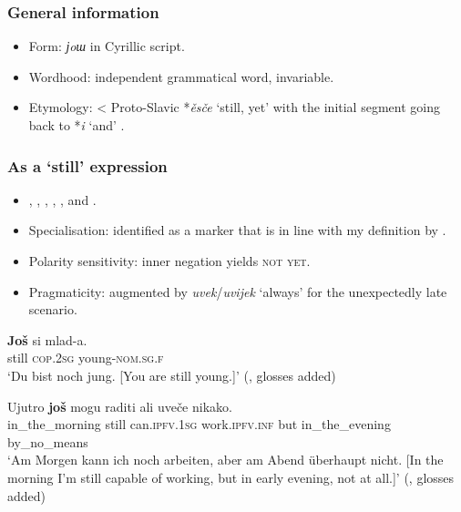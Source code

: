 \subsubsection{General information}
\begin{itemize}
	\item Form: \textit{јoш} in Cyrillic script.
	\item Wordhood: independent grammatical word, invariable.
	\item Etymology: < Proto-Slavic \mbox{*\textit{ěsče}} \lq still, yet' with the initial segment going back to \mbox{*\textit{i}} \lq and' \parencite[146]{Derksen2008}.
\end{itemize}


\subsubsection{As a \lq{}still\rq{ }expression}
\begin{itemize}
	\item \textcite[161]{Alexander2006}, \textcite{Buchholz1991}, \textcite[739]{KontrastiveGrammatik}, \textcite[69–70]{Hammond2005}, \textcite{Prajnkovic2018}, \textcite{Tekavcic1989} and \textcite[s.v. \textit{još}]{HJP}.
		\item Specialisation: identified as a marker that is in line with my definition by \textcite{vanderAuwera1998}.
	\item Polarity sensitivity: inner negation yields \textsc{not yet}.
	\item Pragmaticity: augmented by \textit{uvek}/\textit{uvijek} \lq always' for the unexpectedly late scenario.
	\end{itemize}
\begin{exe}
	\ex
	\gll \textbf{Još} si mlad-a.\\
	still \textsc{cop}.2\textsc{sg} young-\textsc{nom}.\textsc{sg}.\textsc{f}\\
	\glt \lq Du bist noch jung. [You are still young.]' (\cite[26]{Buchholz1991}, glosses added)
	
	\ex
	\gll Ujutro \textbf{još} mogu raditi ali uveče nikako.\\
	in\_the\_morning still can.\textsc{ipfv}.1\textsc{sg} work.\textsc{ipfv}.\textsc{inf} but in\_the\_evening by\_no\_means\\
	\glt \lq Am Morgen kann ich noch arbeiten, aber am Abend überhaupt nicht. [In the morning I'm still capable of working, but in early evening, not at all.]' (\cite[889]{KontrastiveGrammatik}, glosses added)
\end{exe}

